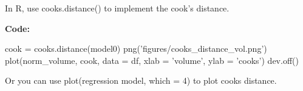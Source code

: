 \documentclass[12pt]{article}
\begin{document}
In R, use cooks.distance() to implement the cook's distance.


{\textbf {Code:}}\\
\begin{rc}
cook = cooks.distance(model0)
png('figures/cooks_distance_vol.png')
plot(norm_volume, cook, data = df, xlab = 'volume', ylab = 'cooks')
dev.off()
\end{rc}


\begin{figure}[H]
\end{figure}


Or you can use plot(regression model, which = 4) to plot cooks 
distance.

\begin{figure}[H]
\end{figure}
\end{document}
